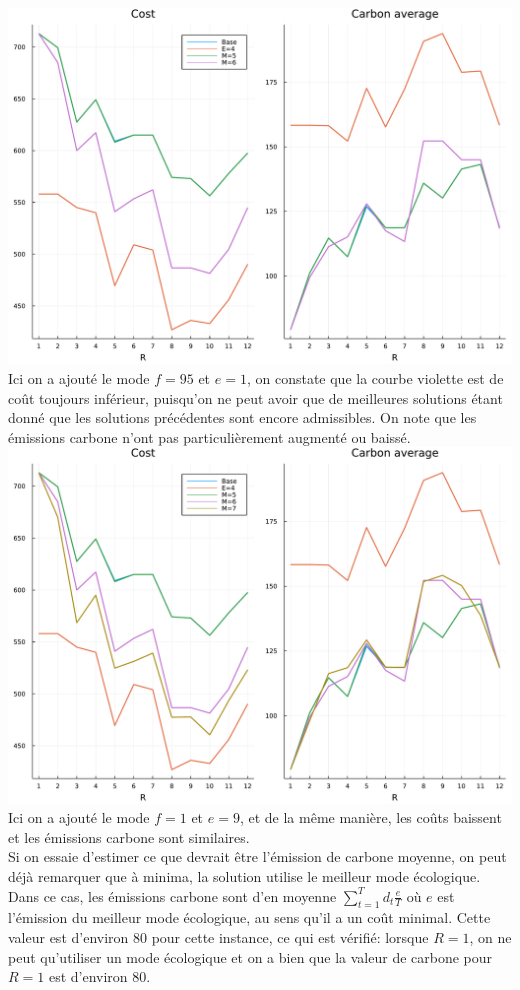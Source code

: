 \documentclass{article}
\begin{document}
	\includegraphics[width=\textwidth]{graph4.pdf}\\Ici on a ajouté le mode $f=95$ et $e=1$, on constate que la courbe violette est de coût toujours inférieur, puisqu'on ne peut avoir que de meilleures solutions étant donné que les solutions précédentes sont encore admissibles. On note que les émissions carbone n'ont pas particulièrement augmenté ou baissé.\\\newpage
	\includegraphics[width=\textwidth]{graph5.pdf}\\Ici on a ajouté le mode $f=1$ et $e=9$, et de la même manière, les coûts baissent et les émissions carbone sont similaires.\\
	Si on essaie d'estimer ce que devrait être l'émission de carbone moyenne, on peut déjà remarquer que à minima, la solution utilise le meilleur mode écologique. Dans ce cas, les émissions carbone sont d'en moyenne $\displaystyle{\sum_{t=1}^T d_t \frac{e}{T}}$ où $e$ est l'émission du meilleur mode écologique, au sens qu'il a un coût minimal. Cette valeur est d'environ 80 pour cette instance, ce qui est vérifié: lorsque $R=1$, on ne peut qu'utiliser un mode écologique et on a bien que la valeur de carbone pour $R=1$ est d'environ 80.\\
\end{document}
